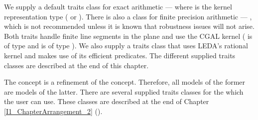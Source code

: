 We supply a default traits class for exact arithmetic ---
where  is the kernel representation type
( or ).  There is also a class
for finite precision arithmetic --- ,
which is not recommended unless it is known that robustness issues will not
arise. 
Both traits handle
finite line segments in the plane
and use the CGAL kernel ( is of type 
 and  is of type
).
We also supply a traits class that uses LEDA's rational kernel and makes use
of its efficient predicates. The different supplied traits classes are described at the end of this chapter.

The  
concept is a refinement of the  concept.
Therefore, all models of the former are models of the latter. 
There are several supplied traits classes for the  which the user can use. 
These classes are described at the end of Chapter \ref{I1_ChapterArrangement_2}
().


